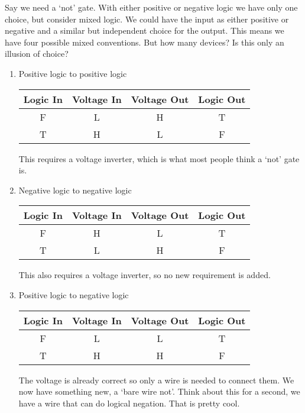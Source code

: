 \begin{example}
Say we need a `not' gate. With either positive or negative logic we have only one choice, but consider mixed logic.  We could have the input as either positive or negative and a similar but independent choice for the output.  This means we have four possible mixed conventions.  But how many devices? Is this only an illusion of choice?
\begin{enumerate}
\item Positive logic to positive logic

\begin{tabular}{cc||cc}
Logic In & Voltage In & Voltage Out & Logic Out \\\hline
F        & L          & H           & T         \\
T        & H          & L           & F         \\
\end{tabular}

This requires a voltage inverter, which is what most people think a `not' gate is.

\item Negative logic to negative logic

\begin{tabular}{cc||cc}
Logic In & Voltage In & Voltage Out & Logic Out \\\hline
F        & H          & L           & T         \\
T        & L          & H           & F         \\
\end{tabular}

This also requires a voltage inverter, so no new requirement is added.

\item Positive logic to negative logic

\begin{tabular}{cc||cc}
Logic In & Voltage In & Voltage Out & Logic Out \\\hline
F        & L          & L           & T         \\
T        & H          & H           & F         \\
\end{tabular}

The voltage is already correct so only a wire is needed to connect them.  We now have something new, a `bare wire not'.  Think about this for a second, we have a wire that can do logical negation.  That is pretty cool.


\end{enumerate}
\end{example}
